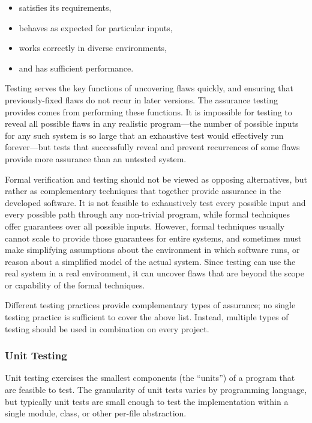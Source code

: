 \begin{itemize}
\item satisfies its requirements,
\item behaves as expected for particular inputs,
\item works correctly in diverse environments,
\item and has sufficient performance.
\end{itemize}

Testing serves the key functions of uncovering flaws quickly, and
ensuring that previously-fixed flaws do not recur in later
versions. The assurance testing provides comes from performing these
functions. It is impossible for testing to reveal all possible flaws
in any realistic program---the number of possible inputs for any such
system is so large that an exhaustive test would effectively run
forever---but tests that successfully reveal and prevent recurrences
of some flaws provide more assurance than an untested system.

Formal verification and testing should not be viewed as opposing
alternatives, but rather as complementary techniques that together
provide assurance in the developed software. It is not feasible to
exhaustively test every possible input and every possible path through
any non-trivial program, while formal techniques offer guarantees over
all possible inputs. However, formal techniques usually cannot scale
to provide those guarantees for entire systems, and sometimes must
make simplifying assumptions about the environment in which software
runs, or reason about a simplified model of the actual system. Since
testing can use the real system in a real environment, it can uncover
flaws that are beyond the scope or capability of the formal
techniques.

Different testing practices provide complementary types of assurance;
no single testing practice is sufficient to cover the above
list. Instead, multiple types of testing should be used in
combination on every project.

\subsubsection{Unit Testing}

Unit testing exercises the smallest components (the ``units'') of a
program that are feasible to test. The granularity of unit tests
varies by programming language, but typically unit tests are small
enough to test the implementation within a single module, class, or
other per-file abstraction.

